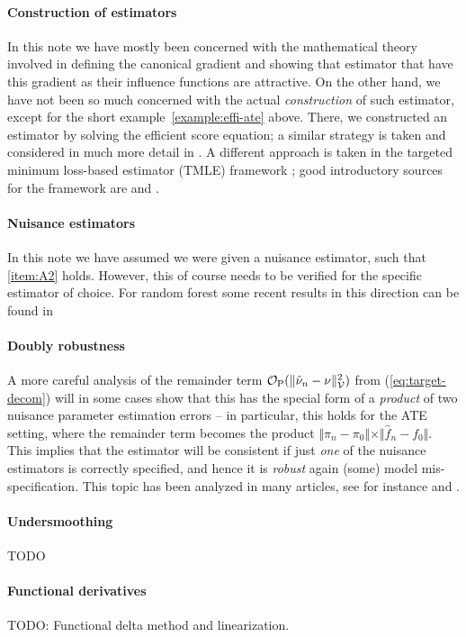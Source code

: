 \documentclass[a4,danish]{article}
\begin{document}
\paragraph{Construction of estimators}
In this note we have mostly been concerned with the mathematical theory involved in defining the
canonical gradient and showing that estimator that have this gradient as their influence functions
are attractive. On the other hand, we have not been so much concerned with the actual
\textit{construction} of such estimator, except for the short example~\ref{example:effi-ate} above.
There, we constructed an estimator by solving the efficient score equation; a similar strategy is
taken and considered in much more detail in \cite{chernozhukov2018double}. A different approach is
taken in the targeted minimum loss-based estimator (TMLE) framework
\citep{van2006targeted,van2011targeted}; good introductory sources for the framework are
\cite{van2014targeted} and \cite{rosenblum2011simple}. 

\paragraph{Nuisance estimators}
In this note we have assumed we were given a nuisance estimator, such that \ref{item:A2} holds.
However, this of course needs to be verified for the specific estimator of choice. For random forest
some recent results in this direction can be found in
\cite{wager2015adaptive,duroux2016impact,athey2019generalized}

\paragraph{Doubly robustness}
A more careful analysis of the remainder term
$\mathcal{O}_{\P}(\Vert \hat{\nu}_n - \nu \Vert_{\mathcal{V}}^2)$ from
(\ref{eq:target-decom}) will in some cases show that this has the
special form of a \textit{product} of two nuisance parameter
estimation errors -- in particular, this holds for the ATE setting,
where the remainder term becomes the product
$\Vert \hat{\pi}_n - \pi_0 \Vert \times \Vert \hat{f}_n - f_0
\Vert$. This implies that the estimator will be consistent if just
\textit{one} of the nuisance estimators is correctly specified, and
hence it is \textit{robust} again (some) model mis-specification. This
topic has been analyzed in many articles, see for instance
\cite{glynn2010introduction} and \cite{bang2005doubly}.


\paragraph{Undersmoothing}
TODO

\paragraph{Functional derivatives}
TODO: Functional delta method and linearization. 



\end{document}
